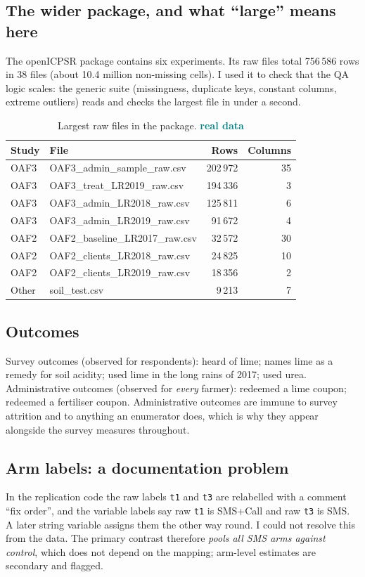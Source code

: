 \documentclass[11pt,a4paper]{article}
\newcommand{\real}{\textcolor{teal}{\sffamily\bfseries real data}}
\begin{document}
\subsection{The wider package, and what ``large'' means here}
The openICPSR package contains six experiments. Its raw files total 756\,586 rows in 38 files (about 10.4 million non-missing cells). I used it to check that the QA logic scales: the generic suite (missingness, duplicate keys, constant columns, extreme outliers) reads and checks the largest file in under a second.
\begin{table}[H]\centering\small\setlength{\tabcolsep}{6pt}\begin{tabular}{llrr}
\toprule
Study & File & Rows & Columns \\
\midrule
OAF3 & OAF3\_admin\_sample\_raw.csv & 202\,972 & 35 \\
OAF3 & OAF3\_treat\_LR2019\_raw.csv & 194\,336 & 3 \\
OAF3 & OAF3\_admin\_LR2018\_raw.csv & 125\,811 & 6 \\
OAF3 & OAF3\_admin\_LR2019\_raw.csv & 91\,672 & 4 \\
OAF2 & OAF2\_baseline\_LR2017\_raw.csv & 32\,572 & 30 \\
OAF2 & OAF2\_clients\_LR2018\_raw.csv & 24\,825 & 10 \\
OAF2 & OAF2\_clients\_LR2019\_raw.csv & 18\,356 & 2 \\
Other & soil\_test.csv & 9\,213 & 7 \\
\bottomrule
\end{tabular}\caption{Largest raw files in the package. \real}\end{table}

\subsection{Outcomes}
Survey outcomes (observed for respondents): heard of lime; names lime as a remedy for soil acidity; used lime in the long rains of 2017; used urea. Administrative outcomes (observed for \emph{every} farmer): redeemed a lime coupon; redeemed a fertiliser coupon. Administrative outcomes are immune to survey attrition and to anything an enumerator does, which is why they appear alongside the survey measures throughout.

\subsection{Arm labels: a documentation problem}
In the replication code the raw labels \texttt{t1} and \texttt{t3} are relabelled with a comment ``fix order'', and the variable labels say raw \texttt{t1} is SMS+Call and raw \texttt{t3} is SMS. A later string variable assigns them the other way round. I could not resolve this from the data. The primary contrast therefore \emph{pools all SMS arms against control}, which does not depend on the mapping; arm-level estimates are secondary and flagged.
\end{document}
